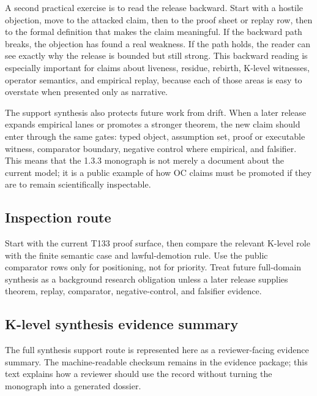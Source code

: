 A second practical exercise is to read the release backward. Start with a hostile objection, move to the attacked claim, then to the proof sheet or replay row, then to the formal definition that makes the claim meaningful. If the backward path breaks, the objection has found a real weakness. If the path holds, the reader can see exactly why the release is bounded but still strong. This backward reading is especially important for claims about liveness, residue, rebirth, K-level witnesses, operator semantics, and empirical replay, because each of those areas is easy to overstate when presented only as narrative.


The support synthesis also protects future work from drift. When a later release expands empirical lanes or promotes a stronger theorem, the new claim should enter through the same gates: typed object, assumption set, proof or executable witness, comparator boundary, negative control where empirical, and falsifier. This means that the 1.3.3 monograph is not merely a document about the current model; it is a public example of how OC claims must be promoted if they are to remain scientifically inspectable.


\subsection{Inspection route}

Start with the current T133 proof surface, then compare the relevant K-level role with the finite semantic case and lawful-demotion rule. Use the public comparator rows only for positioning, not for priority. Treat future full-domain synthesis as a background research obligation unless a later release supplies theorem, replay, comparator, negative-control, and falsifier evidence.


\subsection{K-level synthesis evidence summary}

The full synthesis support route is represented here as a reviewer-facing evidence summary. The machine-readable checksum remains in the evidence package; this text explains how a reviewer should use the record without turning the monograph into a generated dossier.
